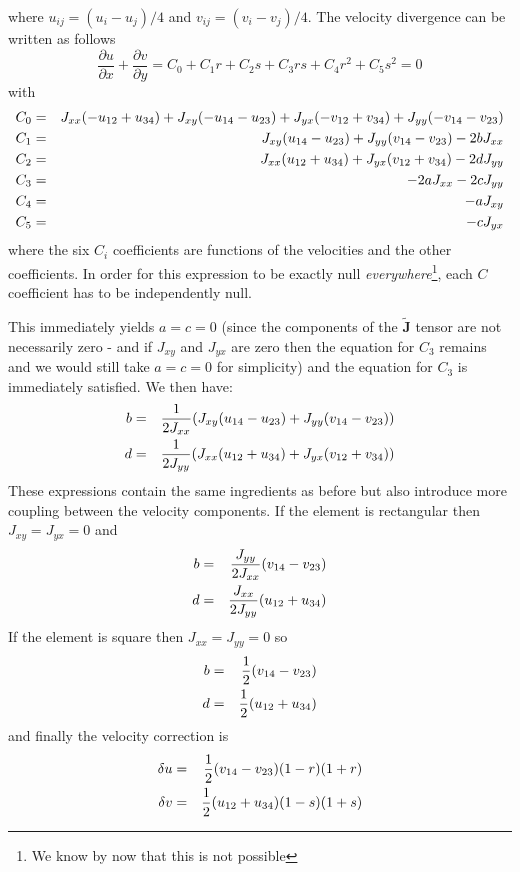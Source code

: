 where $u_{ij}=(u_i-u_j)/4$ and $v_{ij}=(v_i-v_j)/4$.
The velocity divergence can be written as follows
\[
\frac{\partial u}{\partial x} 
+\frac{\partial v}{\partial y} = C_0 +C_1 r + C_2 s + C_3 rs + C_4 r^2 + C_5 s^2 =0
\]
with
\begin{eqnarray}
C_0 &=& J_{xx} (-u_{12} + u_{34} ) + J_{xy} (- u_{14} - u_{23} )  + J_{yx}  (-v_{12} + v_{34}) + J_{yy} (-v_{14} - v_{23} )  \nonumber\\ 
C_1 &=& J_{xy} (u_{14} - u_{23}) + J_{yy} (v_{14} - v_{23}) - 2 b J_{xx}   \nonumber\\ 
C_2 &=& J_{xx} (u_{12} + u_{34}) + J_{yx} ( v_{12} + v_{34} )  - 2 d J_{yy}    \nonumber\\ 
C_3 &=& -2 a J_{xx}  -2 c J_{yy} \nonumber\\ 
C_4 &=& -a J_{xy}  \nonumber\\
C_5 &=& -c J_{yx}  \nonumber\\
\end{eqnarray}
where the six $C_i$ coefficients are functions of the velocities and the other coefficients.
In order for this expression to be exactly null {\it everywhere}\footnote{We know by now 
that this is not possible}, each $C$ coefficient has
to be independently null.

This immediately yields $a=c=0$ (since the components of the $\tilde{\bm J}$ tensor
are not necessarily zero - and if $J_{xy}$ and $J_{yx}$ are zero then the equation 
for $C_3$ remains and we would still take $a=c=0$ for simplicity) 
and the equation for $C_3$ is immediately satisfied.
We then have:
\begin{eqnarray}
b&=&\frac{1}{2J_{xx}} ( J_{xy} (u_{14} - u_{23}) + J_{yy} (v_{14} - v_{23})  )  \nonumber\\
d&=&\frac{1}{2J_{yy}} ( J_{xx} (u_{12} + u_{34}) + J_{yx} ( v_{12} + v_{34} ) ) \nonumber
\end{eqnarray}
These expressions contain the same ingredients as before but also 
introduce more coupling between the velocity components. 
If the element is rectangular then $J_{xy}=J_{yx}=0$ and 
\begin{eqnarray}
b&=&\frac{J_{yy}}{2J_{xx}} ( v_{14} - v_{23} ) \nonumber\\
d&=&\frac{J_{xx}}{2J_{yy}} ( u_{12} + u_{34} ) \nonumber
\end{eqnarray}
If the element is square then $J_{xx}=J_{yy}=0$ so 
\begin{eqnarray}
b&=&\frac{1}{2} ( v_{14} - v_{23} ) \nonumber\\
d&=&\frac{1}{2} ( u_{12} + u_{34} ) \nonumber
\end{eqnarray}
and finally the velocity correction is 
\begin{eqnarray}
\delta u&=&\frac{1}{2} ( v_{14} - v_{23} ) (1-r)(1+r)\nonumber\\
\delta v&=&\frac{1}{2} ( u_{12} + u_{34} ) (1-s)(1+s)\label{eq:cvi_corr1}
\end{eqnarray}


